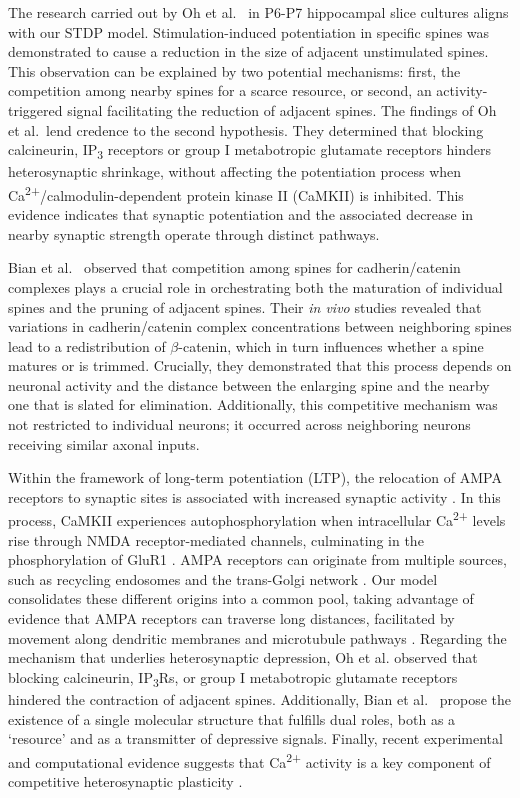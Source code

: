 \documentclass[utf8]{FrontiersinHarvard} %
\begin{document}
The research carried out by Oh et al.~\citeyearpar{Oh.2015} in P6-P7 hippocampal slice cultures aligns with our STDP model. Stimulation-induced potentiation in specific spines was demonstrated to cause a reduction in the size of adjacent unstimulated spines. This observation can be explained by two potential mechanisms: first, the competition among nearby spines for a scarce resource, or second, an activity-triggered signal facilitating the reduction of adjacent spines. The findings of Oh et al.~lend credence to the second hypothesis. They determined that blocking calcineurin, IP\textsubscript{3} receptors or group I metabotropic glutamate receptors hinders heterosynaptic shrinkage, without affecting the potentiation process when Ca\textsuperscript{2+}/calmodulin-dependent protein kinase II (CaMKII) is inhibited. This evidence indicates that synaptic potentiation and the associated decrease in nearby synaptic strength operate through distinct pathways.

Bian et al.~\citeyearpar{Bian.2015} observed that competition among spines for cadherin/catenin complexes plays a crucial role in orchestrating both the maturation of individual spines and the pruning of adjacent spines. Their \textit{in vivo} studies revealed that variations in cadherin/catenin complex concentrations between neighboring spines lead to a redistribution of $\beta$-catenin, which in turn influences whether a spine matures or is trimmed. Crucially, they demonstrated that this process depends on neuronal activity and the distance between the enlarging spine and the nearby one that is slated for elimination. Additionally, this competitive mechanism was not restricted to individual neurons; it occurred across neighboring neurons receiving similar axonal inputs.

Within the framework of long-term potentiation (LTP), the relocation of AMPA receptors to synaptic sites is associated with increased synaptic activity \citep{Hayashi.2000,Sutton.2006u4b,Shi.2001}. In this process, CaMKII experiences autophosphorylation when intracellular Ca\textsuperscript{2+} levels rise through NMDA receptor-mediated channels, culminating in the phosphorylation of GluR1 \citep{Roche.1996}. AMPA receptors can originate from multiple sources, such as recycling endosomes \citep{Park.2004} and the trans-Golgi network \citep{Horton.2004}. Our model consolidates these different origins into a common pool, taking advantage of evidence that AMPA receptors can traverse long distances, facilitated by movement along dendritic membranes \citep{Choquet.2003} and microtubule pathways \citep{Washbourne.2002}. Regarding the mechanism that underlies heterosynaptic depression, Oh et al. \citeyearpar{Oh.2015} observed that blocking calcineurin, IP\textsubscript{3}Rs, or group I metabotropic glutamate receptors hindered the contraction of adjacent spines. Additionally, Bian et al.~\citeyearpar{Bian.2015} propose the existence of a single molecular structure that fulfills dual roles, both as a `resource' and as a transmitter of depressive signals. Finally, recent experimental and computational evidence suggests that Ca\textsuperscript{2+} activity is a key component of competitive heterosynaptic plasticity \citep{Chater.2024}.
\end{document}
